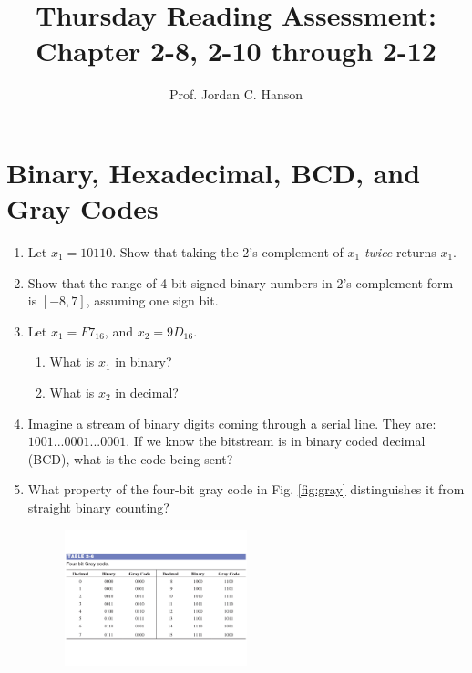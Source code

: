 \documentclass{article}
\begin{document}
\title{Thursday Reading Assessment: Chapter 2-8, 2-10 through 2-12}
\author{Prof. Jordan C. Hanson}

\maketitle

\section{Binary, Hexadecimal, BCD, and Gray Codes}

\begin{enumerate}
\item Let $x_1 = 10110$.  Show that taking the 2's complement of $x_1$ \textit{twice} returns $x_1$. \\ \vspace{0.15cm}
\item Show that the range of 4-bit signed binary numbers in 2's complement form is $[-8,7]$, assuming one sign bit. \\ \vspace{0.25cm}
\item Let $x_1 = F7_{16}$, and $x_2 = 9D_{16}$.
\begin{enumerate}
\item What is $x_1$ in binary? \\ \vspace{0.25cm}
\item What is $x_2$ in decimal? \\ \vspace{0.25cm}
\end{enumerate}
\item Imagine a stream of binary digits coming through a serial line.  They are: $1001 ... 0001 ... 0001$.  If we know the bitstream is in binary coded decimal (BCD), what is the code being sent? \\ \vspace{0.25cm}
\item What property of the four-bit gray code in Fig. \ref{fig:gray} distinguishes it from straight binary counting?
\begin{figure}[hb]
\centering
\includegraphics[width=0.5\textwidth,trim=0cm 3cm 0cm 0cm,clip=true]{figures/gray.pdf}

\end{figure}
\end{enumerate}
\end{document}
